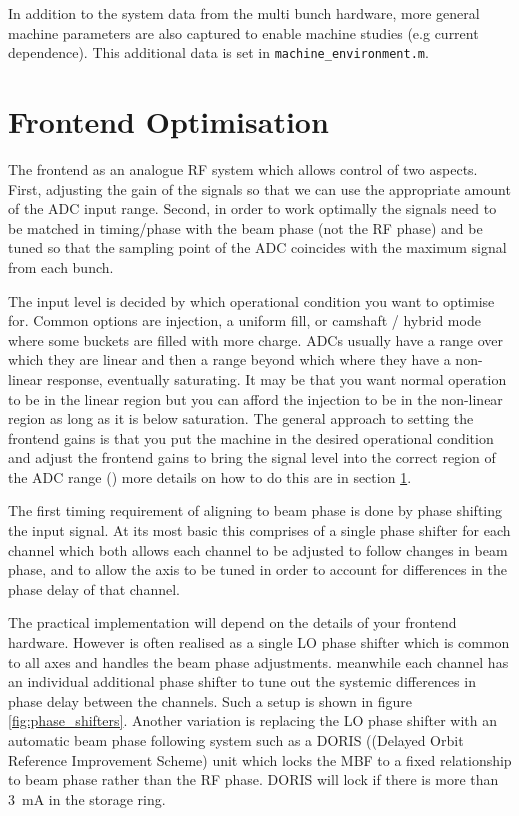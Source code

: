 \documentclass{report}
\begin{document}
In addition to the system data from the multi bunch hardware, more general machine parameters are also captured to enable machine studies (e.g current dependence). This additional data is set in \verb|machine_environment.m|.

\section{Frontend Optimisation}
The frontend as an analogue RF system which allows control of two aspects. First, adjusting the gain of the signals so that we can use the appropriate amount of the ADC input range. Second, in order to work optimally the signals need to be matched in timing/phase with the beam phase (not the RF phase) and be tuned so that the sampling point of the ADC coincides with the maximum signal from each bunch.

The input level is decided by which operational condition you want to optimise for. Common options are injection, a uniform fill, or camshaft / hybrid mode where some buckets are filled with more charge. ADCs usually have a range over which they are linear and then a range beyond which where they have a non-linear response, eventually saturating. It may be that you want normal operation to be in the linear region but you can afford the injection to be in the non-linear region as long as it is below saturation. The general approach to setting the frontend gains is that you put the machine in the desired operational condition and adjust the frontend gains to bring the signal level into the correct region of the ADC range () more details on how to do this are in section  \ref{}.

The first timing requirement of aligning to beam phase is done by phase shifting the input signal. At its most basic this comprises of a single phase shifter for each channel which both allows each channel to be adjusted to follow changes in beam phase, and to allow the axis to be  tuned in order to account for differences in the phase delay of that channel.

The practical implementation will depend on the details of your frontend hardware.
However is often realised as a single LO phase shifter which is common to all axes and handles the beam phase adjustments. meanwhile each channel has an individual additional phase shifter to tune out the systemic differences in phase delay between the channels. Such a setup is shown in figure \ref{fig:phase_shifters}.
Another variation is replacing the LO phase shifter with an automatic beam phase following system such as a DORIS ((Delayed Orbit Reference Improvement Scheme) unit which locks the MBF to a fixed relationship to beam phase rather than the RF phase. 
DORIS will lock if there is more than 3~mA in the storage ring.
\end{document}

